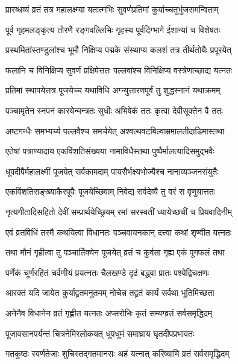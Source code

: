 \twolineshloka
{प्रारब्धव्यं व्रतं तत्र महालक्ष्म्या यतात्मभिः}
{सुवर्णप्रतिमां कुर्याच्चतुर्भुजसमन्विताम्}%


\twolineshloka
{पूर्व गृहमलङ्कृत्य तोरणै रङ्गवल्लिभिः}
{गृहस्य पूर्वदिग्भागे ईशान्यां च विशेषतः}%


\twolineshloka
{प्रस्थमितांस्तण्डुलांश्च भूमौ निक्षिप्य पद्मके}
{संस्थाप्य कलशं तत्र तीर्थतोयैः प्रपूरयेत्}%


\twolineshloka
{फलानि च विनिक्षिप्य सुवर्णं प्रक्षिपेत्ततः}
{पल्लवांश्च विनिक्षिप्य वस्त्रेणाच्छाद्य यत्नतः}%


\twolineshloka
{प्रतिमां स्थापयेत्तत्र पूजयेच्च यथाविधि}
{अग्न्युत्तारणपूर्वं तु शुद्धस्नानं यथाक्रमम्}%


\twolineshloka
{पञ्चामृतेन स्नपनं कारयेन्मन्त्रतः सुधीः}
{अभिषेकं ततः कृत्वा देवीसूक्तेन वै ततः}%


\twolineshloka
{अष्टगन्धैः समभ्यर्च्य पल्लवैश्च समर्चयेत्}
{अश्वत्थवटबिल्वाम्रमालतीदाडिमास्तथा}%


\twolineshloka
{एतेषां पत्राण्यादाय एकविंशतिसंख्यया}
{नामाविधैस्तथा पुष्पैर्मालत्यादिसमुद्भवैः}%


\twolineshloka
{धूपदीपैर्महालक्ष्मीं पूजयेत् सर्वकामदाम्}
{पायसैर्भक्ष्यभोज्यैश्च नानाव्यञ्जनसंयुतैः}%


\twolineshloka
{एकविंशतिसङ्ख्याकैरपूपैः पूजयेच्छिवाम्}
{निवेद्य सर्वदेव्यै तु वरं स वृणुयात्ततः}%


\twolineshloka
{नृत्यगीतादिसहितो देवीं सम्प्रार्थयेच्छ्रियम्}
{रमां सरस्वतीं ध्यायेच्छचीं च प्रियवादिनीम्}%


\twolineshloka
{एवं व्रतविधिं तस्मै कथयित्वा विधानतः}
{पञ्चवायनकान् दत्त्वा कथां शृण्वीत यत्नतः}%


\twolineshloka
{तथा मौनं गृहीत्वा तु पञ्चार्तिक्येन पूजयेत्}
{व्रतं च कुर्वता गृह्य एकं पूगफलं तथा}%


\twolineshloka
{पर्णेकं चूर्णरहितं चर्वणीयं प्रयत्नतः}
{चैलखण्डे दृढं बद्ध्वा प्रातः पश्येद्विचक्षणः}%


\twolineshloka
{आरक्तं यदि जायेत कुर्याद्व्रतमनुतमम्}
{नोचेन्न तद्व्रतं कार्यं सर्वथा भूतिमिच्छता}%


\twolineshloka
{अनेनैव विधानेन व्रतं गृह्णीत यत्नतः}
{अप्सरोभिः कृतं सम्यग्व्रतं सर्वसमृद्धिदम्}%


\twolineshloka
{पूजावसानपर्यन्तं चित्रनेमिरलोकयत्}
{धूपधूमं समाघ्राय घृतदीपप्रभावतः}%


\twolineshloka
{गतकुष्ठः स्वर्णतेजाः शुचिस्तद्गतमानसः}
{अहं यत्नात् करिष्यामि व्रतं सर्वसमृद्धिदम्}%


